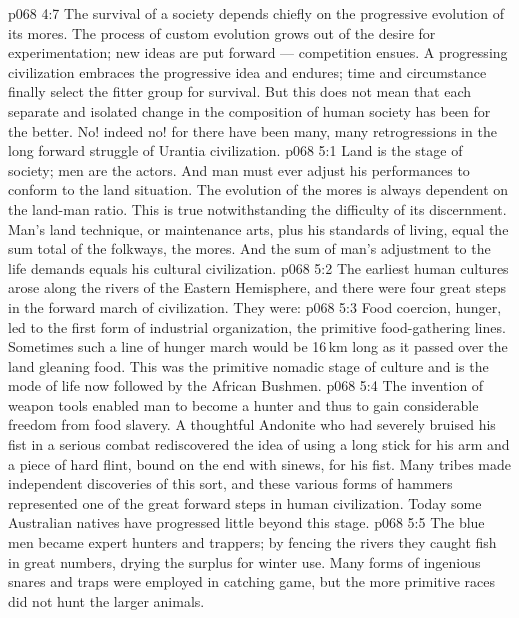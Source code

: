 \vs p068 4:7 The survival of a society depends chiefly on the progressive evolution of its mores. The process of custom evolution grows out of the desire for experimentation; new ideas are put forward --- competition ensues. A progressing civilization embraces the progressive idea and endures; time and circumstance finally select the fitter group for survival. But this does not mean that each separate and isolated change in the composition of human society has been for the better. No! indeed no! for there have been many, many retrogressions in the long forward struggle of Urantia civilization.
\vs p068 5:1 Land is the stage of society; men are the actors. And man must ever adjust his performances to conform to the land situation. The evolution of the mores is always dependent on the land\hyp{}man ratio. This is true notwithstanding the difficulty of its discernment. Man’s land technique, or maintenance arts, plus his standards of living, equal the sum total of the folkways, the mores. And the sum of man’s adjustment to the life demands equals his cultural civilization.
\vs p068 5:2 The earliest human cultures arose along the rivers of the Eastern Hemisphere, and there were four great steps in the forward march of civilization. They were:
\vs p068 5:3 \bibnobreakspace {} Food coercion, hunger, led to the first form of industrial organization, the primitive food\hyp{}gathering lines. Sometimes such a line of hunger march would be 16\,km long as it passed over the land gleaning food. This was the primitive nomadic stage of culture and is the mode of life now followed by the African Bushmen.
\vs p068 5:4 \bibnobreakspace {} The invention of weapon tools enabled man to become a hunter and thus to gain considerable freedom from food slavery. A thoughtful Andonite who had severely bruised his fist in a serious combat rediscovered the idea of using a long stick for his arm and a piece of hard flint, bound on the end with sinews, for his fist. Many tribes made independent discoveries of this sort, and these various forms of hammers represented one of the great forward steps in human civilization. Today some Australian natives have progressed little beyond this stage.
\vs p068 5:5 The blue men became expert hunters and trappers; by fencing the rivers they caught fish in great numbers, drying the surplus for winter use. Many forms of ingenious snares and traps were employed in catching game, but the more primitive races did not hunt the larger animals.
